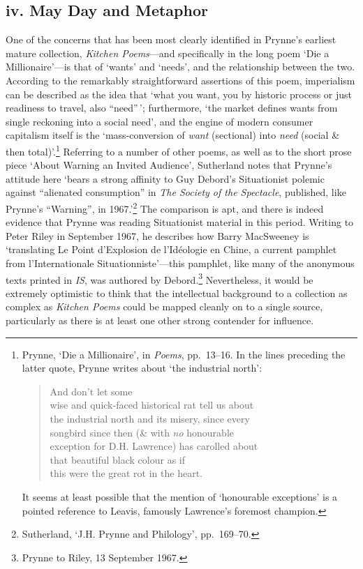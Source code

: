 \documentclass[]{article}
\begin{document}
\subsection{iv. May Day and Metaphor}\label{iv.-may-day-and-metaphor}

One of the concerns that has been most clearly identified in Prynne's
earliest mature collection, \emph{Kitchen Poems}---and specifically in
the long poem `Die a Millionaire'---is that of `wants' and `needs', and
the relationship between the two. According to the remarkably
straightforward assertions of this poem, imperialism can be described as
the idea that `what you want, you by \textbar{} historic process or just
readiness \textbar{} to travel, also ``need''\,'; furthermore, `the
market defines wants from \textbar{} single reckoning into a social
need', and the engine of modern consumer capitalism itself is the
`mass-conversion of \emph{want} (sectional) into \textbar{} \emph{need}
(social \& then total)'.\footnote{Prynne, `Die a Millionaire', in
  \emph{Poems}, pp.~13--16. In the lines preceding the latter quote,
  Prynne writes about `the industrial north':

  \begin{quote}
  And don't let some\\
  wise and quick-faced historical rat tell us about\\
  the industrial north and its misery, since every\\
  songbird since then (\& with \emph{no} honourable\\
  exception for D.H. Lawrence) has carolled about\\
  that beautiful black colour as if\\
  this were the great rot in the heart.
  \end{quote}

  It seems at least possible that the mention of `honourable exceptions'
  is a pointed reference to Leavis, famously Lawrence's foremost
  champion.} Referring to a number of other poems, as well as to the
short prose piece `About Warning an Invited Audience', Sutherland notes
that Prynne's attitude here `bears a strong affinity to Guy Debord's
Situationist polemic against ``alienated consumption'' in \emph{The
Society of the Spectacle}, published, like Prynne's ``Warning'', in
1967.'\footnote{Sutherland, `J.H. Prynne and Philology', pp.~169--70.}
The comparison is apt, and there is indeed evidence that Prynne was
reading Situationist material in this period. Writing to Peter Riley in
September 1967, he describes how Barry MacSweeney is `translating Le
Point d'Explosion de l'Idéologie en Chine, a current pamphlet from
l'Internationale Situationniste'---this pamphlet, like many of the
anonymous texts printed in \emph{IS}, was authored by Debord.\footnote{Prynne
  to Riley, 13 September 1967.} Nevertheless, it would be extremely
optimistic to think that the intellectual background to a collection as
complex as \emph{Kitchen Poems} could be mapped cleanly on to a single
source, particularly as there is at least one other strong contender for
influence.
\end{document}
